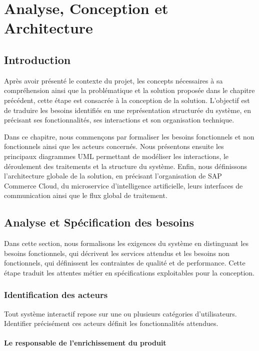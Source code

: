 ﻿\chapter{Analyse, Conception et Architecture }
\label{chap:deuxiemechapitre}

\section{Introduction}

Après avoir présenté le contexte du projet, les concepts nécessaires à sa compréhension ainsi que la problématique et la solution proposée dans le chapitre précédent, cette étape est consacrée à la conception de la solution. L'objectif est de traduire les besoins identifiés en une représentation structurée du système, en précisant ses fonctionnalités, ses interactions et son organisation technique.

Dans ce chapitre, nous commençons par formaliser les besoins fonctionnels et non fonctionnels ainsi que les acteurs concernés. Nous présentons ensuite les principaux diagrammes UML permettant de modéliser les interactions, le déroulement des traitements et la structure du système. Enfin, nous définissons l'architecture globale de la solution, en précisant l'organisation de SAP Commerce Cloud, du microservice d'intelligence artificielle, leurs interfaces de communication ainsi que le flux global de traitement.

\section{Analyse et Spécification des besoins}

Dans cette section, nous formalisons les exigences du système en distinguant les besoins fonctionnels, qui décrivent les services attendus et les besoins non fonctionnels, qui définissent les contraintes de qualité et de performance. Cette étape traduit les attentes métier en spécifications exploitables pour la conception.
\newpage
\subsection{Identification des acteurs}

Tout système interactif repose sur une ou plusieurs catégories d'utilisateurs. Identifier précisément ces acteurs définit les fonctionnalités attendues.

\subsubsection{Le responsable de l'enrichissement du produit}

